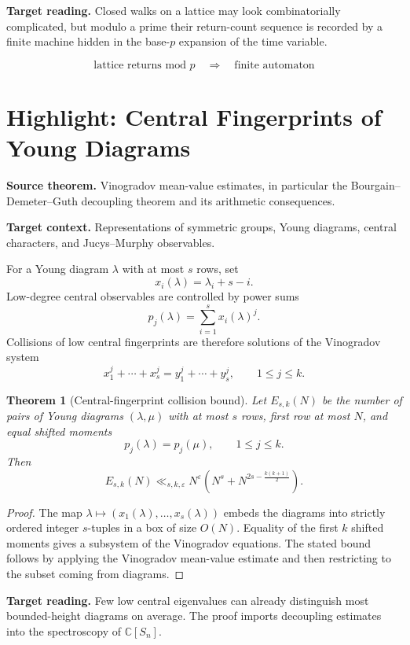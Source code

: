 \documentclass[11pt]{article}
\newtheorem{theorem}{Theorem}[section]
\begin{document}
\textbf{Target reading.}
Closed walks on a lattice may look combinatorially complicated, but modulo a prime their return-count sequence is recorded by a finite machine hidden in the base-\(p\) expansion of the time variable.

\[
\boxed{
\text{lattice returns mod }p
\quad\Longrightarrow\quad
\text{finite automaton}
}
\]

\section{Highlight: Central Fingerprints of Young Diagrams}

\textbf{Source theorem.}
Vinogradov mean-value estimates, in particular the Bourgain--Demeter--Guth decoupling theorem and its arithmetic consequences.

\textbf{Target context.}
Representations of symmetric groups, Young diagrams, central characters, and Jucys--Murphy observables.

For a Young diagram \(\lambda\) with at most \(s\) rows, set
\[
x_i(\lambda)=\lambda_i+s-i.
\]
Low-degree central observables are controlled by power sums
\[
p_j(\lambda)=\sum_{i=1}^s x_i(\lambda)^j.
\]
Collisions of low central fingerprints are therefore solutions of the Vinogradov system
\[
x_1^j+\cdots+x_s^j
=
y_1^j+\cdots+y_s^j,
\qquad
1\leq j\leq k.
\]

\begin{theorem}[Central-fingerprint collision bound]
Let \(E_{s,k}(N)\) be the number of pairs of Young diagrams \((\lambda,\mu)\) with at most \(s\) rows, first row at most \(N\), and equal shifted moments
\[
p_j(\lambda)=p_j(\mu),
\qquad 1\leq j\leq k.
\]
Then
\[
E_{s,k}(N)
\ll_{s,k,\varepsilon}
N^\varepsilon
\left(
N^s+N^{2s-\frac{k(k+1)}2}
\right).
\]
\end{theorem}

\begin{proof}
The map \(\lambda\mapsto (x_1(\lambda),\ldots,x_s(\lambda))\) embeds the diagrams into strictly ordered integer \(s\)-tuples in a box of size \(O(N)\). Equality of the first \(k\) shifted moments gives a subsystem of the Vinogradov equations. The stated bound follows by applying the Vinogradov mean-value estimate and then restricting to the subset coming from diagrams.
\end{proof}

\textbf{Target reading.}
Few low central eigenvalues can already distinguish most bounded-height diagrams on average. The proof imports decoupling estimates into the spectroscopy of \(\mathbb C[S_n]\).
\end{document}

